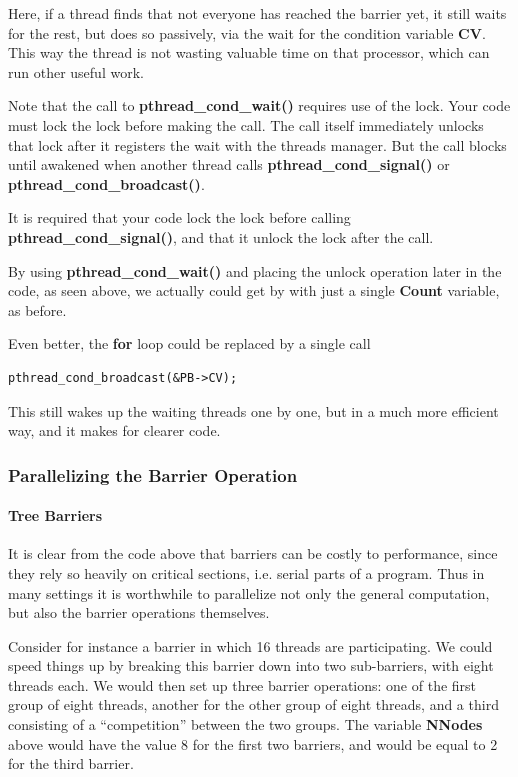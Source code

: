 Here, if a thread finds that not everyone has reached the barrier
yet, it still waits for the rest, but does so passively, via the
wait for the condition variable {\bf CV}.  This way the thread is not
wasting valuable time on that processor, which can run other useful
work.

Note that the call to {\bf pthread\_cond\_wait()} requires use of the
lock.  Your code must lock the lock before making the call.  The call
itself immediately unlocks that lock after it registers the wait with
the threads manager.  But the call blocks until awakened when another
thread calls {\bf pthread\_cond\_signal()} or {\bf
pthread\_cond\_broadcast()}.

It is required that your code lock the lock before calling {\bf
pthread\_cond\_signal()}, and that it unlock the lock after the call.

By using {\bf pthread\_cond\_wait()} and placing the unlock operation
later in the code, as seen above, we actually could get by with just a
single {\bf Count} variable, as before.

Even better, the {\bf for} loop could be replaced by a single call

\begin{Verbatim}[fontsize=\relsize{-2}]
pthread_cond_broadcast(&PB->CV);
\end{Verbatim}

This still wakes up the waiting threads one by one, but in a much more
efficient way, and it makes for clearer code.

\subsubsection{Parallelizing the Barrier Operation}

\paragraph{Tree Barriers}

It is clear from the code above that barriers can be costly to
performance, since they rely so heavily on critical sections, i.e.
serial parts of a program.  Thus in many settings it is worthwhile to
parallelize not only the general computation, but also the barrier
operations themselves.

Consider for instance a barrier in which 16 threads are participating.
We could speed things up by breaking this barrier down into two
sub-barriers, with eight threads each.  We would then set up three
barrier operations:  one of the first group of eight threads, another
for the other group of eight threads, and a third consisting of a
``competition'' between the two groups.   The variable
{\bf NNodes} above would have the value 8 for the first two barriers,
and would be equal to 2 for the third barrier.

